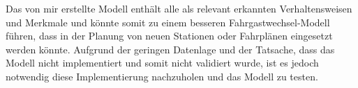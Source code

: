 Das von mir erstellte Modell enthält alle als relevant erkannten Verhaltensweisen und Merkmale und könnte somit zu einem besseren Fahrgastwechsel-Modell führen, dass in der Planung von neuen Stationen oder Fahrplänen eingesetzt werden könnte. Aufgrund der geringen Datenlage und der Tatsache, dass das Modell nicht implementiert und somit nicht validiert wurde, ist es jedoch notwendig diese Implementierung nachzuholen und das Modell zu testen.